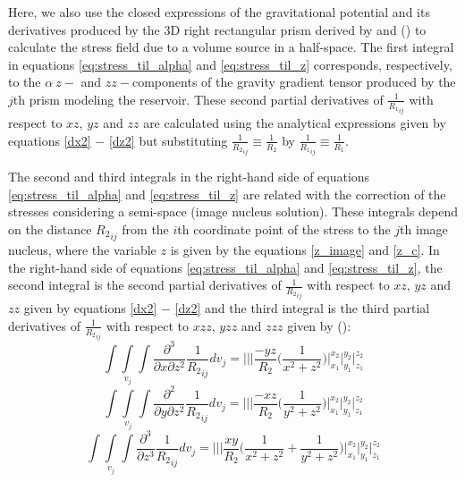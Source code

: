 \documentclass[journal abbreviation, manuscript]{copernicus}
\begin{document}
Here, we also use the closed expressions of the gravitational potential and its derivatives produced by the 3D right rectangular prism derived by \cite{Nagyetal2000} and (\citeyear{Nagyetal2002}) to calculate the stress field due to a volume source in a half-space.  
The first integral in equations  \ref{eq:stress_til_alpha} and \ref{eq:stress_til_z}
corresponds, respectively, to the $\alpha \:z-$ and $zz-$components of the gravity gradient tensor produced by the $j$th prism modeling the reservoir.
These second partial derivatives of ${\frac{1}{{R_1}_{ij}}}$ with respect to $xz$, $yz$ and $zz$ are calculated using the analytical expressions given by equations \ref{dx2} $-$ \ref{dz2} but substituting 
$\frac{1}{{R_2}_{ij}} \equiv \frac{1}{R_2}$ by 
$\frac{1}{{R_1}_{ij}} \equiv \frac{1}{R_1}$.

The second and third integrals in the right-hand side of  equations  \ref{eq:stress_til_alpha}  and \ref{eq:stress_til_z} are related with the correction of the stresses considering  a semi-space (image nucleus solution).
These integrals depend on the distance ${R_2}_{ij}$ from the $i$th coordinate point of the stress to the $j$th image nucleus, where the variable $z$ is given by the equations \ref{z_image} and \ref{z_c}.
In the right-hand side of  equations  \ref{eq:stress_til_alpha} and \ref{eq:stress_til_z}, 
the second integral is the second partial derivatives of ${\frac{1}{{R_2}_{ij}}}$ with respect to $xz$, $yz$ and $zz$ given by equations  \ref{dx2} $-$ \ref{dz2} and the third integral is the third partial derivatives of ${\frac{1}{{R_2}_{ij}}}$ with respect to $xzz$, $yzz$ and $zzz$ given by (\cite{Nagyetal2000}):
\begin{equation}
\int\int\limits_{v_j}\int 
\frac{\partial^{3}}{\partial x \partial z^{2}} {\frac{1}{{R_2}_{ij}}}  dv_j =
\Bigg|\Bigg|\Bigg| 
\frac{- y z}{R_2} \Big( \frac{1}{x^{2} + z^{2}} \Big)
\Bigg|_{x_1}^{x_2} \Bigg|_{y_1}^{y_2} \Bigg|_{z_1}^{z_2}
\label{sx3}
\end{equation}
\begin{equation}
\int\int\limits_{v_j}\int  
\frac{\partial^{2}  }{\partial y \partial z^{2}} {\frac{1}{{R_2}_{ij}}}  dv_j =
\Bigg|\Bigg|\Bigg|
\frac{- x z}{R_2} \Big( \frac{1}{y^{2} + z^{2}} \Big)
\Bigg|_{x_1}^{x_2} \Bigg|_{y_1}^{y_2} \Bigg|_{z_1}^{z_2}
\label{sy3}
\end{equation}
\begin{equation}
\int\int\limits_{v_j}\int 
\frac{\partial^{3}  }{\partial z^{3}} {\frac{1}{{R_2}_{ij}}}  dv_j =
\Bigg|\Bigg|\Bigg|
\frac{ x y}{R_2} \Big( \frac{1}{x^{2} + z^{2}} + \frac{1}{y^{2} + z^{2}} \Big)
\Bigg|_{x_1}^{x_2} \Bigg|_{y_1}^{y_2} \Bigg|_{z_1}^{z_2}
\label{sz3}
\end{equation}
\end{document}
